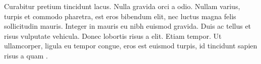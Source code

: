 Curabitur pretium tincidunt lacus. Nulla gravida orci a odio. Nullam varius,
turpis et commodo pharetra, est eros bibendum elit, nec luctus magna felis
sollicitudin mauris. Integer in mauris eu nibh euismod gravida. Duis ac tellus
et risus vulputate vehicula. Donec lobortis risus a elit. Etiam tempor. Ut
ullamcorper, ligula eu tempor congue, eros est euismod turpis, id tincidunt
sapien risus a quam \cite{ContohBuku2011}.

\lipsum[1-5]
